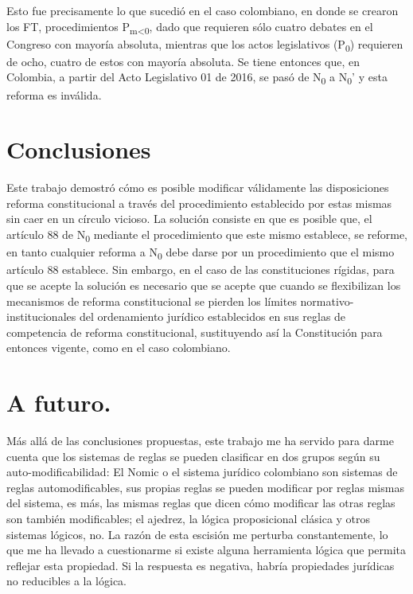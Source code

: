 \documentclass[]{book}
\begin{document}
Esto fue precisamente lo que sucedió en el caso colombiano, en donde se
crearon los FT, procedimientos P\textsubscript{m\textless{}0}, dado que
requieren sólo cuatro debates en el Congreso con mayoría absoluta,
mientras que los actos legislativos (P\textsubscript{0}) requieren de
ocho, cuatro de estos con mayoría absoluta. Se tiene entonces que, en
Colombia, a partir del Acto Legislativo 01 de 2016, se pasó de N\textsubscript{0} a
N\textsubscript{0}' y esta reforma es inválida.

\section*{Conclusiones}

Este trabajo demostró cómo es posible modificar válidamente las
disposiciones reforma constitucional a través del procedimiento
establecido por estas mismas sin caer en un círculo vicioso. La solución
consiste en que es posible que, el artículo 88 de N\textsubscript{0}
mediante el procedimiento que este mismo establece, se reforme, en tanto
cualquier reforma a N\textsubscript{0} debe darse por un procedimiento
que el mismo artículo 88 establece. Sin embargo, en el caso de las
constituciones rígidas, para que se acepte la solución es necesario que
se acepte que cuando se flexibilizan los mecanismos de reforma
constitucional se pierden los límites normativo-institucionales del
ordenamiento jurídico establecidos en sus reglas de competencia de
reforma constitucional, sustituyendo así la Constitución para entonces
vigente, como en el caso colombiano.

\section*{A futuro.}

Más allá de las conclusiones propuestas, este trabajo me ha servido para
darme cuenta que los sistemas de reglas se pueden clasificar en dos grupos
según su auto-modificabilidad: El Nomic o el sistema jurídico colombiano
son sistemas de reglas automodificables, sus propias reglas se pueden
modificar por reglas mismas del sistema, es más, las mismas reglas que
dicen cómo modificar las otras reglas son también modificables; el
ajedrez, la lógica proposicional clásica y otros sistemas lógicos, no.
La razón de esta escisión me perturba constantemente, lo que me ha
llevado a cuestionarme si existe alguna herramienta lógica que permita
reflejar esta propiedad. Si la respuesta es negativa, habría propiedades
jurídicas no reducibles a la lógica.
\end{document}
